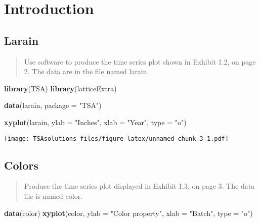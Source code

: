\documentclass[]{book}
\newenvironment{Shaded}{\begin{snugshade}}{\end{snugshade}}
\newcommand{\KeywordTok}[1]{\textcolor[rgb]{0.13,0.29,0.53}{\textbf{{#1}}}}
\newcommand{\DataTypeTok}[1]{\textcolor[rgb]{0.13,0.29,0.53}{{#1}}}
\newcommand{\StringTok}[1]{\textcolor[rgb]{0.31,0.60,0.02}{{#1}}}
\newcommand{\NormalTok}[1]{{#1}}
\theoremstyle{definition}
\theoremstyle{definition}
\theoremstyle{remark}
\begin{document}
\chapter{Introduction}\label{introduction}

\section{Larain}\label{larain}

\begin{quote}
Use software to produce the time series plot shown in Exhibit 1.2, on
page 2. The data are in the file named larain.
\end{quote}

\begin{Shaded}
\begin{Highlighting}[]
\KeywordTok{library}\NormalTok{(TSA)}
\KeywordTok{library}\NormalTok{(latticeExtra)}

\KeywordTok{data}\NormalTok{(larain, }\DataTypeTok{package =} \StringTok{"TSA"}\NormalTok{)}
\end{Highlighting}
\end{Shaded}

\begin{Shaded}
\begin{Highlighting}[]
\KeywordTok{xyplot}\NormalTok{(larain, }\DataTypeTok{ylab =} \StringTok{"Inches"}\NormalTok{, }\DataTypeTok{xlab =} \StringTok{"Year"}\NormalTok{, }\DataTypeTok{type =} \StringTok{"o"}\NormalTok{)}
\end{Highlighting}
\end{Shaded}

\texttt{[image: TSAsolutions\_files/figure-latex/unnamed-chunk-3-1.pdf]}

\section{Colors}\label{colors}

\begin{quote}
Produce the time series plot displayed in Exhibit 1.3, on page 3. The
data file is named color.
\end{quote}

\begin{Shaded}
\begin{Highlighting}[]
\KeywordTok{data}\NormalTok{(color)}
\KeywordTok{xyplot}\NormalTok{(color, }\DataTypeTok{ylab =} \StringTok{"Color property"}\NormalTok{, }\DataTypeTok{xlab =} \StringTok{"Batch"}\NormalTok{, }\DataTypeTok{type =} \StringTok{"o"}\NormalTok{)}
\end{Highlighting}
\end{Shaded}
\end{document}
